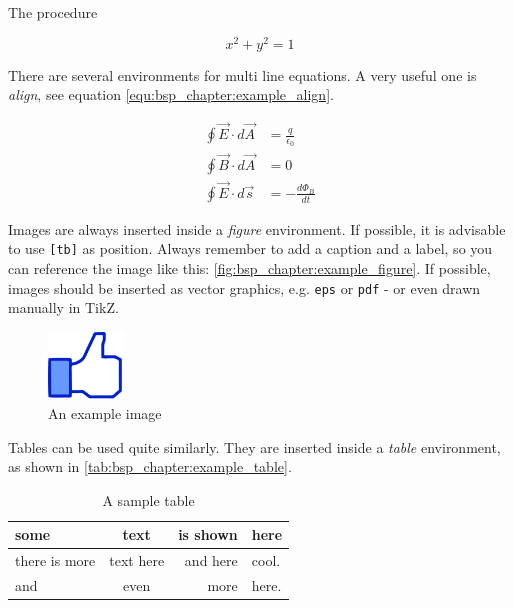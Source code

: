 The procedure 


\begin{equation}
    x^2 + y^2 = 1
    \label{equ:bsp_chapter:example_equation}
\end{equation}

There are several environments for multi line equations. A very useful one
is \emph{align}, see equation \eqref{equ:bsp_chapter:example_align}.

\begin{align}
    \oint \vec{E} \cdot d \vec{A} &= \frac{q}{\epsilon_0} \\
    \oint \vec{B} \cdot d \vec{A} &= 0 \\
    \oint \vec{E} \cdot d \vec{s} &= - \frac{d \Phi_B}{dt}
    \label{equ:bsp_chapter:example_align}
\end{align}

%
Images are always inserted inside a \emph{figure}
environment. If possible, it is advisable to use \texttt{[tb]} as position.
Always remember to add a caption and a label, so you can reference the image
like this: \autoref{fig:bsp_chapter:example_figure}. If possible, images should be
inserted as vector graphics, e.g. \texttt{eps} or \texttt{pdf} - or even drawn
manually in TikZ.

\begin{figure}[t]
    \centering
    \includegraphics[width=2cm]{chapters/bsp_chapter/images/thumbs_up.jpg}
    \caption{An example image}
    \label{fig:bsp_chapter:example_figure}
\end{figure}

Tables can be used quite similarly. They are inserted inside a \emph{table}
environment, as shown in \autoref{tab:bsp_chapter:example_table}.

\begin{table}[t]
    \centering
    \begin{tabular}{lcrp{4cm}} \toprule
        some & text & is shown & here \\ \midrule
        there is more & text here & and here & cool. \\
        and & even & more & here. \\ \bottomrule
    \end{tabular}
    \caption{A sample table}
    \label{tab:bsp_chapter:example_table}
\end{table}

